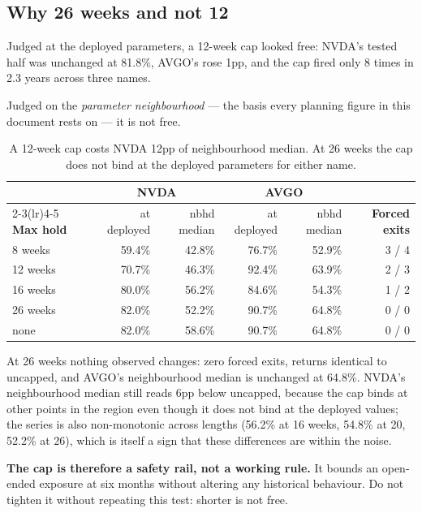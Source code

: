 \documentclass[11pt]{article}
\begin{document}
\subsection{Why 26 weeks and not 12}

Judged at the deployed parameters, a 12-week cap looked free: NVDA's tested half was unchanged at
81.8\%, AVGO's rose 1pp, and the cap fired only 8 times in 2.3 years across three names.

Judged on the \emph{parameter neighbourhood} --- the basis every planning figure in this
document rests on --- it is not free.

\begin{table}[H]\centering\small
\begin{tabular}{lrrrrr}
\toprule
& \multicolumn{2}{c}{\textbf{NVDA}} & \multicolumn{2}{c}{\textbf{AVGO}} &\\
\cmidrule(lr){2-3}\cmidrule(lr){4-5}
\textbf{Max hold} & at deployed & nbhd median & at deployed & nbhd median &
\textbf{Forced exits}\\
\midrule
\rowcolor{bcwarn} 8 weeks  & 59.4\% & 42.8\% & 76.7\% & 52.9\% & 3 / 4\\
\rowcolor{bcwarn} 12 weeks & 70.7\% & 46.3\% & 92.4\% & 63.9\% & 2 / 3\\
16 weeks & 80.0\% & 56.2\% & 84.6\% & 54.3\% & 1 / 2\\
\rowcolor{bckeep} 26 weeks & 82.0\% & 52.2\% & 90.7\% & 64.8\% & 0 / 0\\
none & 82.0\% & 58.6\% & 90.7\% & 64.8\% & 0 / 0\\
\bottomrule
\end{tabular}
\caption{A 12-week cap costs NVDA 12pp of neighbourhood median. At 26 weeks the cap does not bind
at the deployed parameters for either name.}
\end{table}

At 26 weeks nothing observed changes: zero forced exits, returns identical to uncapped, and
AVGO's neighbourhood median is unchanged at 64.8\%. NVDA's neighbourhood median still reads 6pp
below uncapped, because the cap binds at other points in the region even though it does not bind
at the deployed values; the series is also non-monotonic across lengths (56.2\% at 16 weeks,
54.8\% at 20, 52.2\% at 26), which is itself a sign that these differences are within the noise.

\textbf{The cap is therefore a safety rail, not a working rule.} It bounds an open-ended exposure
at six months without altering any historical behaviour. Do not tighten it without repeating this
test: shorter is not free.
\end{document}
